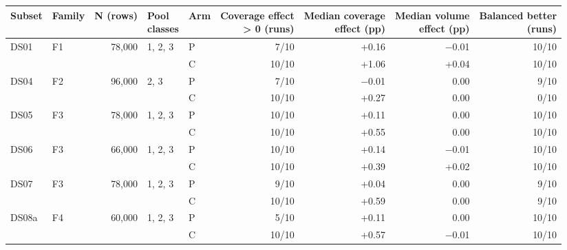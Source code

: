 \begin{tabular}{llrllrrrr}
\toprule
Subset & Family & N (rows) & \makecell{Pool\\classes} & Arm & \makecell{Coverage effect\\> 0 (runs)} & \makecell{Median coverage\\effect (pp)} & \makecell{Median volume\\effect (pp)} & \makecell{Balanced better\\(runs)} \\
\midrule
DS01 & F1 & 78,000 & 1, 2, 3 & P & 7/10 & +0.16 & $-$0.01 & 10/10 \\
 &  &  &  & C & 10/10 & +1.06 & +0.04 & 10/10 \\
\midrule
DS04 & F2 & 96,000 & 2, 3 & P & 7/10 & $-$0.01 & 0.00 & 9/10 \\
 &  &  &  & C & 10/10 & +0.27 & 0.00 & 0/10 \\
\midrule
DS05 & F3 & 78,000 & 1, 2, 3 & P & 10/10 & +0.11 & 0.00 & 10/10 \\
 &  &  &  & C & 10/10 & +0.55 & 0.00 & 10/10 \\
\midrule
DS06 & F3 & 66,000 & 1, 2, 3 & P & 10/10 & +0.14 & $-$0.01 & 10/10 \\
 &  &  &  & C & 10/10 & +0.39 & +0.02 & 10/10 \\
\midrule
DS07 & F3 & 78,000 & 1, 2, 3 & P & 9/10 & +0.04 & 0.00 & 9/10 \\
 &  &  &  & C & 10/10 & +0.59 & 0.00 & 9/10 \\
\midrule
DS08a & F4 & 60,000 & 1, 2, 3 & P & 5/10 & +0.11 & 0.00 & 10/10 \\
 &  &  &  & C & 10/10 & +0.57 & $-$0.01 & 10/10 \\
\bottomrule
\end{tabular}
